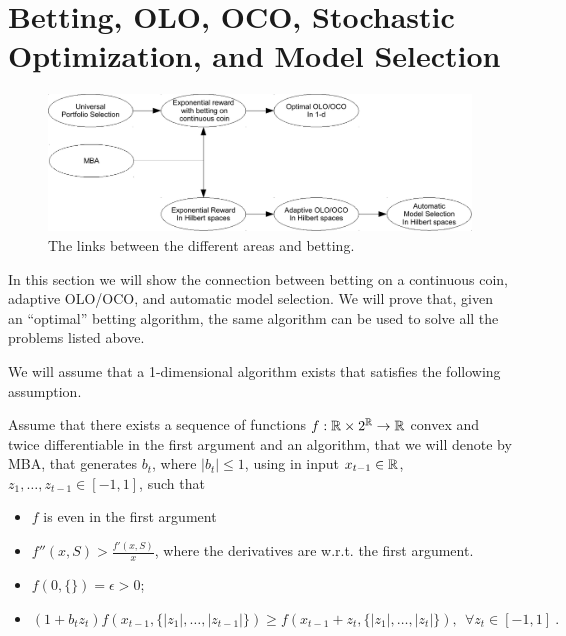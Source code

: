 \section{Betting, OLO, OCO, Stochastic Optimization, and Model Selection}
\label{sec:appl}

\begin{figure}[t]
\centering
\includegraphics[width=.95\linewidth]{./figs/links_between_areas.pdf}
\caption{The links between the different areas and betting.}
\end{figure}

In this section we will show the connection between betting on a continuous coin, adaptive \ac{OLO}/\ac{OCO}, and automatic model selection. We will prove that, given an ``optimal'' betting algorithm, the same algorithm can be used to solve all the problems listed above.

We will assume that a 1-dimensional algorithm exists that satisfies the following assumption.
\begin{assumption}
\label{assumption:1-d_algo}
Assume that there exists a sequence of functions $f:\mathbb{R} \times 2^{\mathbb{R}} \rightarrow \mathbb{R}$ convex and twice differentiable in the first argument and an algorithm, that we will denote by \ac{MBA}, that generates $b_t$, where $|b_t|\leq 1$, using in input $x_{t-1} \in \mathbb{R}$, $z_1, \ldots, z_{t-1} \in [-1,1]$, such that
\begin{itemize}
\item $f$ is even in the first argument
\item $f''(x, S)> \frac{f'(x,S)}{x}$, where the derivatives are w.r.t. the first argument.
\item $f(0,\{\})=\epsilon>0$;
\item  \begin{equation}
\label{eq:1_d_hp}
(1+b_t z_t) f\left( x_{t-1}, \{|z_1|, \ldots, |z_{t-1}|\} \right) \geq f\left( x_{t-1}+z_t, \{|z_1|, \ldots, |z_t|\}\right), \ \ \forall z_{t} \in [-1,1]~.
\end{equation}
\end{itemize}
\end{assumption}

